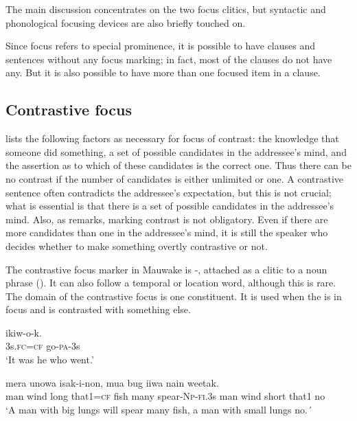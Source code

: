 The main discussion concentrates on the two focus clitics, but syntactic and phonological focusing devices are also briefly touched on.

Since focus refers to special prominence, it is possible to have clauses and sentences without any focus marking; in fact, most of the clauses do not have any. But it is also possible to have more than one focused item in a clause. 

\subsection{Contrastive focus}

\citet{Chafe1976} lists the following factors as necessary for focus of contrast: the knowledge that someone did something, a set of possible candidates in the addressee's mind, and the assertion as to which of these candidates is the correct one. Thus there can be no contrast if the number of candidates is either unlimited or one. A contrastive sentence often contradicts the addressee's expectation, but this is not crucial; what is essential is that there is a set of possible candidates in the addressee's mind. Also, as  \citet[348]{Linde1979} remarks, marking contrast is not obligatory. Even if there are more candidates than one in the addressee's mind, it is still the speaker who decides whether to make something overtly contrastive or not.  

The contrastive focus marker in Mauwake is -, attached as a clitic to a noun phrase (). It can also follow a temporal or location word, although this is rare. The domain of the contrastive focus is one constituent. It is used when the  is in focus and is contrasted with something else. 

\ea%
\label{ex:x1688}
\gll {}  ikiw-o-k. \\
3s.\textsc{fc}=\textsc{cf}  go-\textsc{pa}-3s      \\
\glt`It was he who went.'
\z


\ea%
\label{ex:x1689}
\gll {}     mera  unowa  isak-i-non, mua  bug  iiwa  nain  weetak. \\
man  wind  long  that1=\textsc{cf}  fish  many  spear-\textsc{Np}-\textsc{fi}.3s man  wind  short  that1  no\\
\glt`A man with big lungs will spear many fish, a man with small lungs no.´ 
\z


